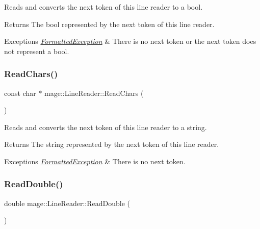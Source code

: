 Reads and converts the next token of this line reader to a {\ttfamily bool}.

\begin{DoxyReturn}{Returns}
The {\ttfamily bool} represented by the next token of this line reader. 
\end{DoxyReturn}

\begin{DoxyExceptions}{Exceptions}
{\em \hyperlink{structmage_1_1_formatted_exception}{Formatted\+Exception}} & There is no next token or the next token does not represent a {\ttfamily bool}. \\
\hline
\end{DoxyExceptions}
\hypertarget{classmage_1_1_line_reader_ad915c1a17549c7758c10f0b6db7e5611}{}\label{classmage_1_1_line_reader_ad915c1a17549c7758c10f0b6db7e5611} 
\subsubsection{\texorpdfstring{Read\+Chars()}{ReadChars()}}
{\footnotesize\ttfamily const char $\ast$ mage\+::\+Line\+Reader\+::\+Read\+Chars (\begin{DoxyParamCaption}{ }\end{DoxyParamCaption})\hspace{0.3cm}{\ttfamily [protected]}}

Reads and converts the next token of this line reader to a string.

\begin{DoxyReturn}{Returns}
The string represented by the next token of this line reader. 
\end{DoxyReturn}

\begin{DoxyExceptions}{Exceptions}
{\em \hyperlink{structmage_1_1_formatted_exception}{Formatted\+Exception}} & There is no next token. \\
\hline
\end{DoxyExceptions}
\hypertarget{classmage_1_1_line_reader_a17f11afdea4692395115c6bdfde03660}{}\label{classmage_1_1_line_reader_a17f11afdea4692395115c6bdfde03660} 
\subsubsection{\texorpdfstring{Read\+Double()}{ReadDouble()}}
{\footnotesize\ttfamily double mage\+::\+Line\+Reader\+::\+Read\+Double (\begin{DoxyParamCaption}{ }\end{DoxyParamCaption})\hspace{0.3cm}{\ttfamily [protected]}}

